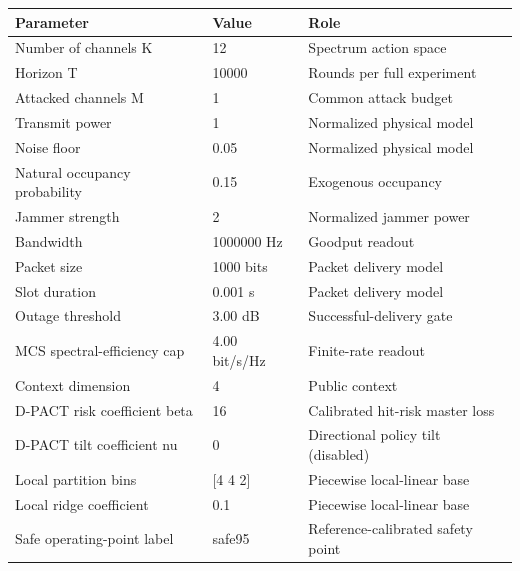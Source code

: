 \begin{tabular}{lll}
\toprule
Parameter & Value & Role \\ 
\midrule
Number of channels K & 12 & Spectrum action space \\ 
Horizon T & 10000 & Rounds per full experiment \\ 
Attacked channels M & 1 & Common attack budget \\ 
Transmit power & 1 & Normalized physical model \\ 
Noise floor & 0.05 & Normalized physical model \\ 
Natural occupancy probability & 0.15 & Exogenous occupancy \\ 
Jammer strength & 2 & Normalized jammer power \\ 
Bandwidth & 1000000 Hz & Goodput readout \\ 
Packet size & 1000 bits & Packet delivery model \\ 
Slot duration & 0.001 s & Packet delivery model \\ 
Outage threshold & 3.00 dB & Successful-delivery gate \\ 
MCS spectral-efficiency cap & 4.00 bit/s/Hz & Finite-rate readout \\ 
Context dimension & 4 & Public context \\ 
D-PACT risk coefficient beta & 16 & Calibrated hit-risk master loss \\ 
D-PACT tilt coefficient nu & 0 & Directional policy tilt (disabled) \\ 
Local partition bins & [4 4 2] & Piecewise local-linear base \\ 
Local ridge coefficient & 0.1 & Piecewise local-linear base \\ 
Safe operating-point label & safe95 & Reference-calibrated safety point \\ 
\bottomrule
\end{tabular}
